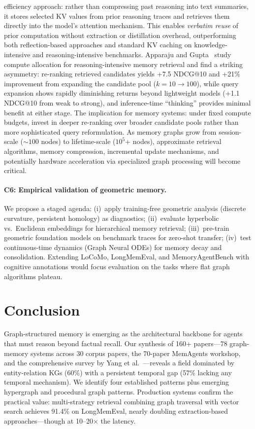 \documentclass[hf]{ceurart}
\begin{document}
efficiency approach: rather than compressing past reasoning into
text summaries, it stores selected KV values from prior reasoning
traces and retrieves them directly into the model's attention
mechanism. This enables \emph{verbatim reuse} of prior computation
without extraction or distillation overhead, outperforming both
reflection-based approaches and standard KV caching on
knowledge-intensive and reasoning-intensive benchmarks.
Apparaju and Gupta~\cite{computealloc2026} study compute allocation
for reasoning-intensive memory retrieval and find a striking
asymmetry: re-ranking retrieved candidates yields +7.5 NDCG@10
and +21\% improvement from expanding the candidate pool
($k{=}10 \to 100$), while query expansion shows rapidly diminishing
returns beyond lightweight models (+1.1 NDCG@10 from weak to
strong), and inference-time ``thinking'' provides minimal benefit
at either stage. The implication for memory systems: under fixed
compute budgets, invest in deeper re-ranking over broader candidate
pools rather than more sophisticated query reformulation.
As memory graphs grow from session-scale (${\sim}100$ nodes) to
lifetime-scale ($10^5$+ nodes), approximate retrieval algorithms,
memory compression, incremental update mechanisms, and potentially
hardware acceleration via specialized graph processing will become
critical.

\paragraph{C6: Empirical validation of geometric memory.}
We propose a staged agenda: (i)~apply training-free geometric
analysis (discrete curvature, persistent homology) as diagnostics;
(ii)~evaluate hyperbolic vs.\ Euclidean embeddings for hierarchical
memory retrieval; (iii)~pre-train geometric foundation models on
benchmark traces for zero-shot transfer; (iv)~test continuous-time
dynamics (Graph Neural ODEs) for memory decay and consolidation.
Extending LoCoMo, LongMemEval, and MemoryAgentBench with cognitive
annotations would focus evaluation on the tasks where flat graph
algorithms plateau.


\section{Conclusion}

Graph-structured memory is emerging as the architectural backbone for
agents that must reason beyond factual recall. Our synthesis of
160+ papers---78 graph-memory systems across 30 corpus papers, the
70-paper MemAgents workshop, and the comprehensive survey by Yang et
al.~\cite{graphmemsurvey2026}---reveals a field dominated by
entity-relation KGs (60\%) with a persistent temporal gap (57\%
lacking any temporal mechanism). We identify four established patterns
plus emerging hypergraph and procedural graph patterns. Production
systems confirm the practical value: multi-strategy retrieval combining
graph traversal with vector search achieves 91.4\% on LongMemEval,
nearly doubling extraction-based approaches---though at
10--20$\times$ the latency.
\end{document}
